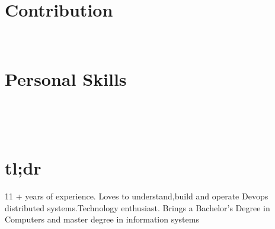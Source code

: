 \documentclass[]{friggeri-cv}
\begin{document}
\begin{aside}
  \section{Contribution}
    ~
  \section{Personal Skills}
    ~
\end{aside}
~

\section{tl;dr}
\begin{entrylist}
  \entry
    {}
    {}
   {}
  {11 + years of experience. Loves to understand,build and operate Devops distributed systems.Technology enthusiast. Brings a Bachelor’s Degree in Computers and master degree in information systems }
\end{entrylist} 
\end{document}
